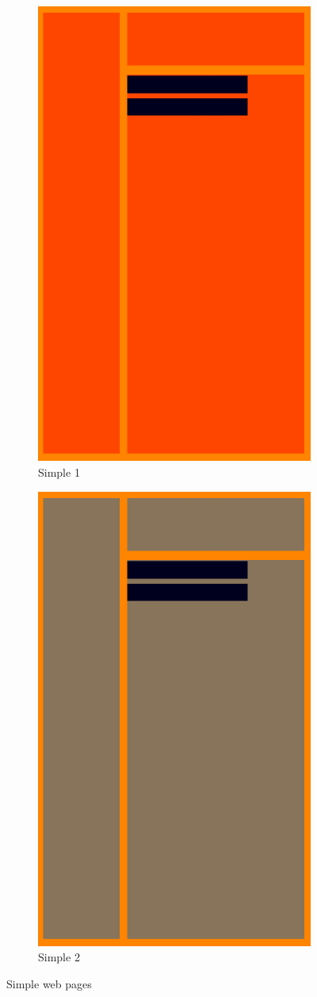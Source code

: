\begin{figure}
\centering
\begin{subfigure}{.5\textwidth}
  \centering
  \includegraphics[width=.5\linewidth]{screenshotofsimple1.png}
  \caption{Simple 1}
  \label{fig:sub1}
\end{subfigure}%
\begin{subfigure}{.5\textwidth}
  \centering
  \includegraphics[width=.5\linewidth]{screenshotofsimple2.png}
  \caption{Simple 2}
  \label{fig:sub2}
\end{subfigure}
\caption{Simple web pages}
\label{fig:test}
\end{figure}


